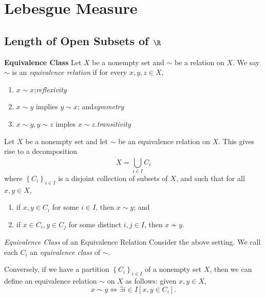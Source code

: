 \documentclass[pmath450]{subfiles}
\begin{document}
    \section{Lebesgue Measure}
    
    \subsection{Length of Open Subsets of $\R$}
    
    \begin{recall}{\textbf{Equivalence Class}}
        Let $X$ be a nonempty set and $\sim$ be a relation on $X$. We say $\sim$ is an \emph{equivalence relation} if for every $x,y,z\in X$,
        \begin{enumerate}
            \item $x\sim x$;\hfill\textit{reflexivity}
            \item $x\sim y$ implies $y\sim x$; and\hfill\textit{symmetry}
            \item $x\sim y, y\sim z$ imples $x\sim z$.\hfill\textit{transitivity}
        \end{enumerate}
    \end{recall}

    \np
    Let $X$ be a nonempty set and let $\sim$ be an equivalence relation on $X$. This gives rise to a decomposition
    \begin{equation*}
        X = \bigcup^{}_{i\in I}C_i
    \end{equation*}
    where $\left\lbrace C_i \right\rbrace^{}_{i\in I}$ is a disjoint collection of subsets of $X$, and such that for all $x,y\in X$,
    \begin{enumerate}
        \item if $x,y\in C_i$ for some $i\in I$, then $x\sim y$; and
        \item if $x\in C_i, y\in C_j$ for some distinct $i,j\in I$, then $x\nsim y$.
    \end{enumerate}

    \begin{recall}{\emph{Equivalence Class} of an Equivalence Relation}
        Consider the above setting. We call each $C_i$ an \emph{equivalence class} of $\sim$.
    \end{recall}

    \np
    Conversely, if we have a partition $\left\lbrace C_i \right\rbrace^{}_{i\in I}$ of a nonempty set $X$, then we can define an equivalence relation $\sim$ on $X$ as follows: given $x,y\in X$,
    \begin{equation}
        x\sim y \iff \exists i\in I\left[ x,y\in C_i \right].
    \end{equation}
\end{document}
